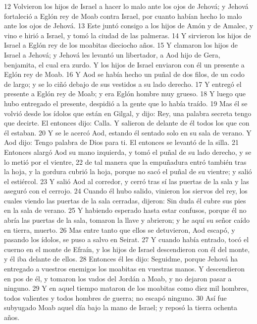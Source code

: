 12 Volvieron los hijos de Israel a hacer lo malo ante los ojos de Jehová; y Jehová fortaleció a Eglón rey de Moab contra Israel, por cuanto habían hecho lo malo ante los ojos de Jehová.
13 Este juntó consigo a los hijos de Amón y de Amalec, y vino e hirió a Israel, y tomó la ciudad de las palmeras.
14 Y sirvieron los hijos de Israel a Eglón rey de los moabitas dieciocho años.
15 Y clamaron los hijos de Israel a Jehová; y Jehová les levantó un libertador, a Aod hijo de Gera, benjamita, el cual era zurdo. Y los hijos de Israel enviaron con él un presente a Eglón rey de Moab.
16 Y Aod se había hecho un puñal de dos filos, de un codo   de largo; y se lo ciñó debajo de sus vestidos a su lado derecho.
17 Y entregó el presente a Eglón rey de Moab; y era Eglón hombre muy grueso.
18 Y luego que hubo entregado el presente, despidió a la gente que lo había traído.
19 Mas él se volvió desde los ídolos que están en Gilgal, y dijo: Rey, una palabra secreta tengo que decirte. El entonces dijo: Calla. Y salieron de delante de él todos los que con él estaban.
20 Y se le acercó Aod, estando él sentado solo en su sala de verano. Y Aod dijo: Tengo palabra de Dios para ti. El entonces se levantó de la silla.
21 Entonces alargó Aod su mano izquierda, y tomó el puñal de su lado derecho, y se lo metió por el vientre,
22 de tal manera que la empuñadura entró también tras la hoja, y la gordura cubrió la hoja, porque no sacó el puñal de su vientre; y salió el estiércol.
23 Y salió Aod al corredor, y cerró tras sí las puertas de la sala y las aseguró con el cerrojo.
24 Cuando él hubo salido, vinieron los siervos del rey, los cuales viendo las puertas de la sala cerradas, dijeron: Sin duda él cubre sus pies en la sala de verano.
25 Y habiendo esperado hasta estar confusos, porque él no abría las puertas de la sala, tomaron la llave y abrieron; y he aquí su señor caído en tierra, muerto.
26 Mas entre tanto que ellos se detuvieron, Aod escapó, y pasando los ídolos, se puso a salvo en Seirat.
27 Y cuando había entrado, tocó el cuerno en el monte de Efraín, y los hijos de Israel descendieron con él del monte, y él iba delante de ellos.
28 Entonces él les dijo: Seguidme, porque Jehová ha entregado a vuestros enemigos los moabitas en vuestras manos. Y descendieron en pos de él, y tomaron los vados del Jordán a Moab, y no dejaron pasar a ninguno.
29 Y en aquel tiempo mataron de los moabitas como diez mil hombres, todos valientes y todos hombres de guerra; no escapó ninguno.
30 Así fue subyugado Moab aquel día bajo la mano de Israel; y reposó la tierra ochenta años.

